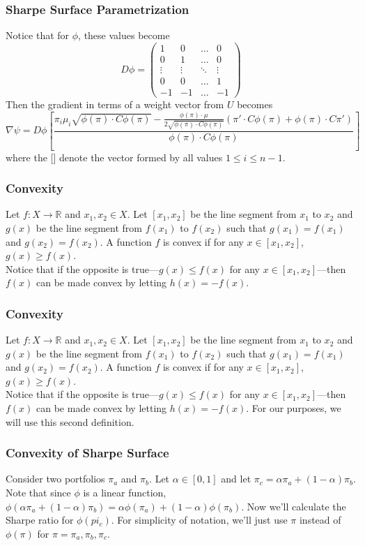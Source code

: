 \documentclass{beamer}
\begin{document}
\begin{frame}
\frametitle{Sharpe Surface Parametrization}
Notice that for $\phi$, these values become
\[ D\phi = \begin{pmatrix}
1 & 0 & \dots & 0 \\
0 & 1 & \dots & 0 \\
\vdots  & \vdots & \ddots & \vdots \\
0 & 0 & \dots & 1 \\
-1 & -1 & \dots & -1 
\end{pmatrix}\]
Then the gradient in terms of a weight vector from $U$ becomes
\[\nabla \psi= D\phi [\frac{\pi_i \mu_i \sqrt{\phi(\pi) \cdot C \phi(\pi) } - \frac{ \phi(\pi)  \cdot \mu}{2\sqrt{\phi(\pi)  \cdot C \phi(\pi) }}(\pi'\cdot C \phi(\pi)  + \phi(\pi)  \cdot C\pi') }{\phi(\pi)  \cdot C \phi(\pi) }]\]
where the [] denote the vector formed by all values $1\leq i \leq n-1$.
\end{frame}


\begin{frame}
\frametitle{Convexity}
Let $f: X \rightarrow \mathbb{R}$ and $x_1, x_2 \in X$.  Let $[x_1, x_2]$ be the line segment from $x_1$ to $x_2$ and $g(x)$ be the line segment from $f(x_1)$ to $f(x_2)$ such that $g(x_1)=f(x_1)$ and $g(x_2)=f(x_2)$.
A function $f$ is convex if for any $x\in [x_1, x_2]$, $g(x) \geq f(x)$.  
\vspace{.1in}
\\Notice that if the opposite is true---$g(x) \leq f(x)$ for any $x\in [x_1, x_2]$---then $f(x)$ can be made convex by letting $h(x)=-f(x)$.
\end{frame}


\begin{frame}
\frametitle{Convexity}
Let $f: X \rightarrow \mathbb{R}$ and $x_1, x_2 \in X$.  Let $[x_1, x_2]$ be the line segment from $x_1$ to $x_2$ and $g(x)$ be the line segment from $f(x_1)$ to $f(x_2)$ such that $g(x_1)=f(x_1)$ and $g(x_2)=f(x_2)$.
A function $f$ is convex if for any $x\in [x_1, x_2]$, $g(x) \geq f(x)$.  
\vspace{.1in}
\\Notice that if the opposite is true---$g(x) \leq f(x)$ for any $x\in [x_1, x_2]$---then $f(x)$ can be made convex by letting $h(x)=-f(x)$.  For our purposes, we will use this second definition.
\end{frame}


\begin{frame}
\frametitle{Convexity of Sharpe Surface}
Consider two portfolios $\pi_a$ and $\pi_b$.  Let $\alpha \in [0,1]$ and let $\pi_c = \alpha \pi_a + (1-\alpha)\pi_b$.  Note that since $\phi$ is a linear function, $\phi(\alpha \pi_a + (1-\alpha)\pi_b) = \alpha \phi(\pi_a) + (1-\alpha)\phi(\pi_b)$.
Now we'll calculate the Sharpe ratio for $\phi(pi_c)$.  For simplicity of notation, we'll just use $\pi$ instead of $\phi(\pi)$ for $\pi = \pi_a, \pi_b, \pi_c$.
\end{frame}
\end{document}
